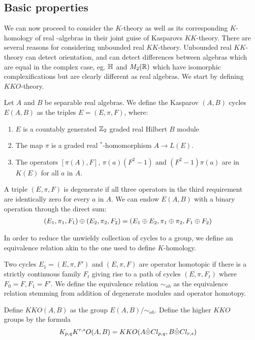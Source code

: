 \subsection{Basic properties}
We can now proceed to consider the $K$-theory as well as its corresponding $K$-homology of real \Cstar-algebras in their joint guise of Kasparovs $KK$-theory. There are several reasons for considering unbounded real $KK$-theory. Unbounded real $KK$-theory can detect orientation, and can detect differences between algebras which are equal in the complex case, eg. $\mathbb{H}$ and $M_2(\mathbb{R})$ which have isomorphic complexifications but are clearly different as real algebras. We start by defining $KKO$-theory. 
\begin{definition}
	Let $A$ and $B$ be separable real \Cstar algebras. We define the Kasparov $(A,B)$ cycles $E(A,B)$ as the triples $E=(E,\pi,F)$, where:
	\begin{enumerate}
		\item
			$E$ is a countably generated $\mathbb{Z}_2$ graded real Hilbert $B$ module 
		\item
			The map $\pi$ is a graded real $^*$-homomorphism $A\to L(E)$. 
		\item
			The operators $[\pi(A),F]$, $\pi(a)(F^2-1)$ and $(F^2-1)\pi(a)$ are in $K(E)$ for all $a$ in $A$.
	\end{enumerate}
	A triple $(E,\pi,F)$ is degenerate if all three operators in the third requirement are identically zero for every $a$ in $A$. We can endow $E(A,B)$ with a binary operation through the direct sum:
	\begin{align*}
		(E_1,\pi_1,F_1)\oplus (E_2,\pi_2,F_2)=(E_1\oplus E_2,\pi_1\oplus \pi_2,F_1\oplus F_2)
	\end{align*}
\end{definition}
In order to reduce the unwieldy collection of cycles to a group, we define an equivalence relation akin to the one used to define $K$-homology. 
\begin{definition}
	Two cycles $E_1=(E,\pi,F')$ and $(E,\pi,F)$ are operator homotopic if there is a strictly continuous family $F_t$ giving rise to a path of cycles $(E,\pi,F_t)$ where $F_0=F,F_1=F'$. We define the equivalence relation $\sim_{oh}$ as the equivalence relation stemming from addition of degenerate modules and operator homotopy. 
\end{definition}
\begin{definition}
	Define $KKO(A,B)$ as the group $E(A,B)/\sim_{oh}$. 
	Define the higher $KKO$ groups by the formula 
	\begin{align*}
		K_{p,q}K^{r,s}O(A,B)=KKO(A\hat{\otimes} Cl_{p,q},B\hat{\otimes} Cl_{r,s})
	\end{align*}
\end{definition}
